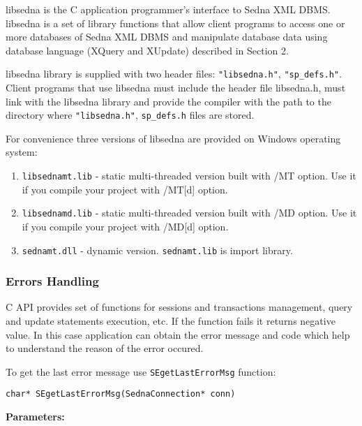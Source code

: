 \documentclass[a4paper,12pt]{article}
\begin{document}
libsedna is the C application programmer's interface to Sedna XML DBMS. libsedna
is a set of library functions that allow client programs to access one or more
databases of Sedna XML DBMS and manipulate database data using database language
(XQuery and XUpdate) described in Section 2.

libsedna library is supplied with two header files: \verb!"libsedna.h"!,
\verb!"sp_defs.h"!. Client programs that use libsedna must include the header
file libsedna.h, must link with the libsedna library and provide the compiler
with the path to the directory where \verb!"libsedna.h"!, \verb!sp_defs.h! files
are stored.

For convenience three versions of libsedna are provided on Windows operating
system:

\begin{enumerate}
\item\verb!libsednamt.lib! - static multi-threaded version built with /MT
option. Use it if you compile your project with /MT[d] option.
\item\verb!libsednamd.lib! - static multi-threaded version built with /MD
option. Use it if you compile your project with /MD[d] option.
\item\verb!sednamt.dll! - dynamic version. \verb!sednamt.lib! is import library.
\end{enumerate}


\subsubsection{Errors Handling}

C API provides set of functions for sessions and transactions management, query
and update statements execution, etc. If the function fails it returns negative
value. In this case application can obtain the error message and code which help
to understand the reason of the error occured.

To get the last error message use \verb!SEgetLastErrorMsg! function:

\begin{verbatim}
char* SEgetLastErrorMsg(SednaConnection* conn)
\end{verbatim}

\noindent
\textbf{Parameters:}
\end{document}
